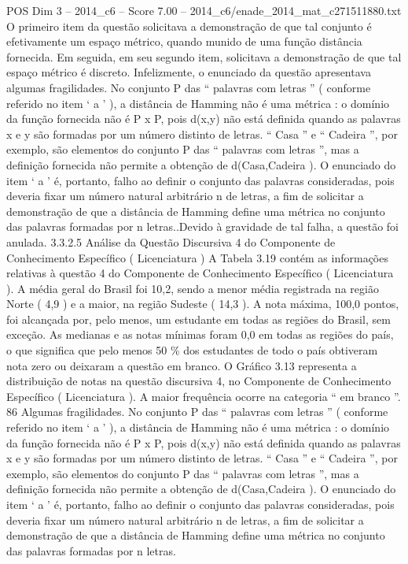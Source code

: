 \begin{textsample}{POS Dim 3 – 2014\_c6 – Score 7.00 – 2014\_c6/enade\_2014\_mat\_c271511880.txt}
O primeiro item da questão solicitava a demonstração de que tal conjunto é efetivamente um espaço métrico, quando munido de uma função distância fornecida.
Em seguida, em seu segundo item, solicitava a demonstração de que tal espaço métrico é discreto.
Infelizmente, o enunciado da questão apresentava algumas fragilidades.
No conjunto P das “ palavras com letras ” ( conforme referido no item ‘ a ’ ), a distância de Hamming não é uma métrica : o domínio da função fornecida não é P x P, pois d(x,y) não está definida quando as palavras x e y são formadas por um número distinto de letras. “ Casa ” e “ Cadeira ”, por exemplo, são elementos do conjunto P das “ palavras com letras ”, mas a definição fornecida não permite a obtenção de d(Casa,Cadeira ).
O enunciado do item ‘ a ’ é, portanto, falho ao definir o conjunto das palavras consideradas, pois deveria fixar um número natural arbitrário n de letras, a fim de solicitar a demonstração de que a distância de Hamming define uma métrica no conjunto das palavras formadas por n letras..Devido à gravidade de tal falha, a questão foi anulada. 3.3.2.5 Análise da Questão Discursiva 4 do Componente de Conhecimento Específico ( Licenciatura ) A Tabela 3.19 contém as informações relativas à questão 4 do Componente de Conhecimento Específico ( Licenciatura ).
A média geral do Brasil foi 10,2, sendo a menor média registrada na região Norte ( 4,9 ) e a maior, na região Sudeste ( 14,3 ).
A nota máxima, 100,0 pontos, foi alcançada por, pelo menos, um estudante em todas as regiões do Brasil, sem exceção.
As medianas e as notas mínimas foram 0,0 em todas as regiões do país, o que significa que pelo menos 50 \% dos estudantes de todo o país obtiveram nota zero ou deixaram a questão em branco.
O Gráfico 3.13 representa a distribuição de notas na questão discursiva 4, no Componente de Conhecimento Específico ( Licenciatura ).
A maior frequência ocorre na categoria “ em branco ”. 86 Algumas fragilidades.
No conjunto P das “ palavras com letras ” ( conforme referido no item ‘ a ’ ), a distância de Hamming não é uma métrica : o domínio da função fornecida não é P x P, pois d(x,y) não está definida quando as palavras x e y são formadas por um número distinto de letras. “ Casa ” e “ Cadeira ”, por exemplo, são elementos do conjunto P das “ palavras com letras ”, mas a definição fornecida não permite a obtenção de d(Casa,Cadeira ).
O enunciado do item ‘ a ’ é, portanto, falho ao definir o conjunto das palavras consideradas, pois deveria fixar um número natural arbitrário n de letras, a fim de solicitar a demonstração de que a distância de Hamming define uma métrica no conjunto das palavras formadas por n letras.

\end{textsample}
